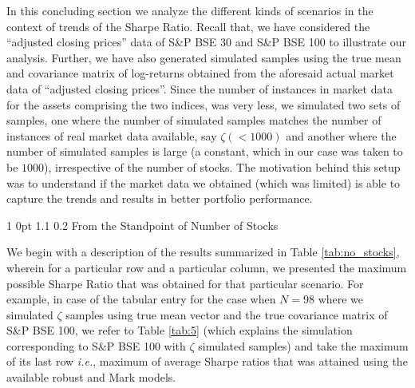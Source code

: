 \documentclass[12pt]{article}
\makeatletter
\numberwithin{equation}{section}
\renewcommand{\subsection}{
  \@startsection
  {subsection}%
  {1}%
  {0pt}%
  {1.1\baselineskip}%
  {0.2\baselineskip}%
  {\sc \centering}%
}
\makeatother
\begin{document}
In this concluding section we analyze the different kinds of scenarios in the context of trends of the Sharpe Ratio. Recall that, we have considered the ``adjusted closing prices'' data of S\&P BSE 30 and S\&P BSE 100 to illustrate our analysis. Further, we have also generated simulated samples using the true mean and covariance matrix of log-returns obtained from the aforesaid actual market data of ``adjusted closing prices''. Since the number of instances in market data for the assets comprising the two indices, was very less, we simulated two sets of samples, one where the number of simulated samples matches the number of instances of real market data available, say $\zeta(<1000)$ and another where the number of simulated samples is large (a constant, which in our case was taken to be $1000$), irrespective of the number of stocks. The motivation behind this setup was to understand if the market data we obtained (which was limited) is able to capture the trends and results in better portfolio performance.

\subsection{From the Standpoint of Number of Stocks}

We begin with a description of the results summarized in Table \ref{tab:no_stocks}, wherein for a particular row and a particular column, we presented the maximum possible Sharpe Ratio that was obtained for that particular scenario. For example, in case of the tabular entry for the case when $N=98$ where we simulated $\zeta$ samples using true mean vector and the true covariance matrix of S\&P BSE 100, we refer to Table \ref{tab:5} (which explains the simulation corresponding to S\&P BSE 100 with $\zeta$ simulated samples) and take the maximum of its last row \textit{i.e.}, maximum of average Sharpe ratios that was attained using the available robust and Mark models.
\end{document}
